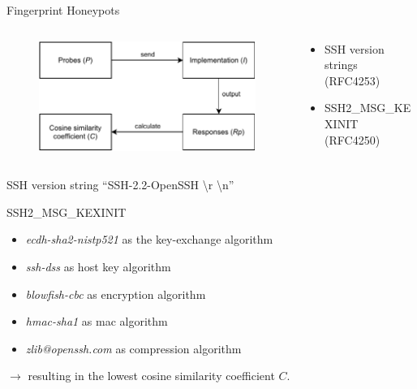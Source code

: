 \begin{frame}{Fingerprint Honeypots}
    \begin{columns}
        \begin{column}{0.5\textwidth}
            \begin{figure}
                \centering
                \includegraphics[width=\columnwidth]{img/vetterl_concept.pdf}
            \end{figure}
        \end{column}
        \begin{column}{0.5\textwidth}
            \begin{itemize}
                \item {} SSH version strings (RFC4253)
                \item {} SSH2\_MSG\_KEXINIT (RFC4250)
            \end{itemize}
        \end{column}
    \end{columns}
    \vfill
    SSH version string \enquote{SSH-2.2-OpenSSH \textbackslash r \textbackslash n}
    
    SSH2\_MSG\_KEXINIT
    {\footnotesize
    \begin{itemize}
        \item \textit{ecdh-sha2-nistp521} as the key-exchange algorithm
        \item \textit{ssh-dss} as host key algorithm
        \item \textit{blowfish-cbc} as encryption algorithm
        \item \textit{hmac-sha1} as mac algorithm
        \item \textit{zlib@openssh.com} as compression algorithm
    \end{itemize}
    }
    $\rightarrow$ resulting in the lowest cosine similarity coefficient $C$.
\end{frame}

